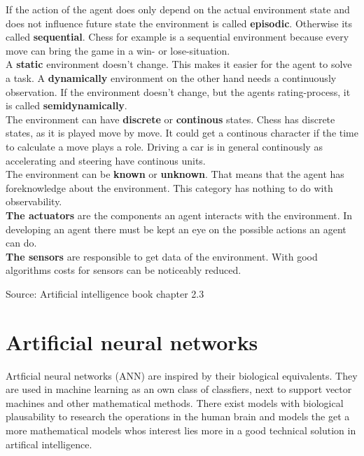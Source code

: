 \documentclass[10pt,a4paper,DIV=11]{scrreprt}
\begin{document}
If the action of the agent does only depend on the actual environment state and does not influence future state the environment is called \textbf{episodic}. Otherwise its called
\textbf{sequential}. Chess for example is a sequential environment because every move can bring the game in a win- or lose-situation. \\

A \textbf{static} environment doesn't change. This makes it easier for the agent to solve a task. A \textbf{dynamically} environment on the other hand needs a continuously observation. If the environment doesn't change, but the agents rating-process, it is called \textbf{semidynamically}. \\

The environment can have \textbf{discrete} or \textbf{continous} states. Chess has discrete states, as it is played move by move. It could get a continous character if the time to calculate a move plays a role. Driving a car is in general continously as accelerating and steering have continous units.\\

The environment can be \textbf{known} or \textbf{unknown}. That means that the agent has foreknowledge about the environment. This category has nothing to do with observability. \\


\textbf{The actuators} are the components an agent interacts with the environment. In developing an agent there must be kept an eye on the possible actions an agent can do.\\

\textbf{The sensors} are responsible to get data of the environment. With good algorithms costs for sensors can be noticeably reduced.


Source: Artificial intelligence book chapter 2.3

\chapter{Artificial neural networks}
Artficial neural networks (ANN) are inspired by their biological equivalents.
They are used in machine learning as an own class of classfiers, next to support vector machines
and other mathematical methods. There exist models with biological plausability to research the
operations in the human brain and models the get a more mathematical models whos interest lies more in a good technical solution in artifical intelligence.
\end{document}
